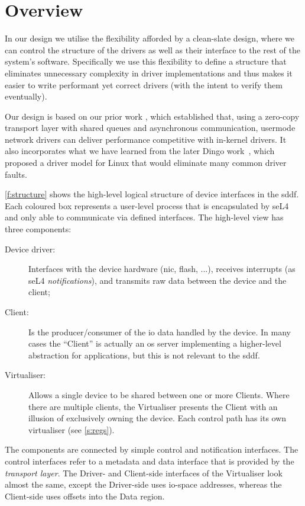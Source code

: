 \documentclass[a4paper,12pt]{report}
\newcommand{\Obj}[1]{\textsl{#1}}
\begin{document}
\section{Overview}

In our design we utilise the flexibility afforded by a clean-slate
design, where we can control the structure of the drivers as well as
their interface to the rest of the system's software.
Specifically we use this flexibility to define a
structure that eliminates unnecessary complexity in driver
implementations and thus makes it easier to write performant yet
correct drivers (with the intent to verify them eventually).

Our design is based on our prior work
\citep{Leslie_CFGGMPSEH_05}, which established that, using a zero-copy
transport layer with shared queues and asynchronous communication, usermode network
drivers can deliver performance competitive with in-kernel drivers. It also
incorporates what we have learned from the later Dingo
work~\citep{Ryzhyk_CKH_09}, which proposed a driver model for Linux
that would eliminate many common driver faults.

\autoref{f:structure} shows the high-level logical structure of device
interfaces in the \gls{sddf}. Each coloured box represents a user-level
process that is encapsulated by seL4 and only able to communicate via
defined interfaces. The high-level view has three components:

\begin{description}
\item[Device driver:] Interfaces with the device hardware (\gls{nic},
  flash, ...), receives interrupts (as seL4 \Obj{notifications}), and
  transmits raw data between the device and the client;
\item[Client:] Is the producer/consumer of the \gls{io} data handled by
  the device. In many cases the ``Client'' is actually an \gls{os} server
  implementing a higher-level abstraction for applications, but this
  is not relevant to the \gls{sddf}.
\item[Virtualiser:] Allows a single device to be shared between one or
  more Clients. Where there are multiple clients, the Virtualiser presents the
  Client with an illusion of exclusively owning the device. Each
  control path has its own virtualiser (see \autoref{s:regs}).
\end{description}

The components are connected by simple control and notification
interfaces. The control interfaces refer to a metadata and data interface that is
provided by the \emph{transport layer}. The Driver- and Client-side
interfaces of the Virtualiser look almost the same, except the
Driver-side uses \gls{io}-space addresses, whereas the Client-side uses
offsets into the Data region.
\end{document}
